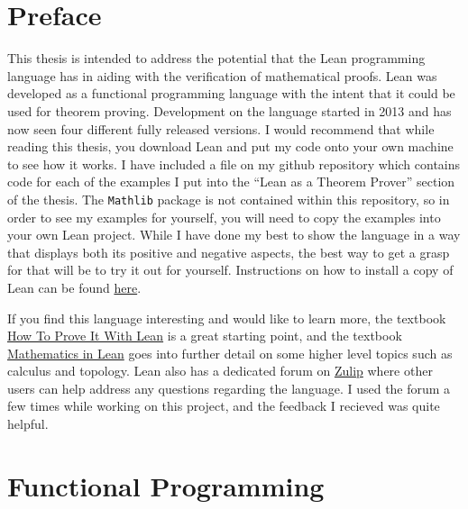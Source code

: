 \documentclass[
  letterpaper,
]{scrreprt}
\theoremstyle{remark}
\begin{document}

\hypertarget{preface}{%
\chapter*{Preface}\label{preface}}


This thesis is intended to address the potential that the Lean
programming language has in aiding with the verification of mathematical
proofs. Lean was developed as a functional programming language with the
intent that it could be used for theorem proving. Development on the
language started in 2013 and has now seen four different fully released
versions. I would recommend that while reading this thesis, you download
Lean and put my code onto your own machine to see how it works. I have
included a file on my github repository which contains code for each of
the examples I put into the ``Lean as a Theorem Prover'' section of the
thesis. The \texttt{Mathlib} package is not contained within this
repository, so in order to see my examples for yourself, you will need
to copy the examples into your own Lean project. While I have done my
best to show the language in a way that displays both its positive and
negative aspects, the best way to get a grasp for that will be to try it
out for yourself. Instructions on how to install a copy of Lean can be
found \href{https://lean-lang.org/lean4/doc/quickstart.html}{here}.

If you find this language interesting and would like to learn more, the
textbook \href{https://djvelleman.github.io/HTPIwL/}{How To Prove It
With Lean} is a great starting point, and the textbook
\href{https://leanprover-community.github.io/mathematics_in_lean/index.html}{Mathematics
in Lean} goes into further detail on some higher level topics such as
calculus and topology. Lean also has a dedicated forum on
\href{https://leanprover.zulipchat.com}{Zulip} where other users can
help address any questions regarding the language. I used the forum a
few times while working on this project, and the feedback I recieved was
quite helpful.


\hypertarget{functional-programming}{%
\chapter{Functional Programming}\label{functional-programming}}
\end{document}
